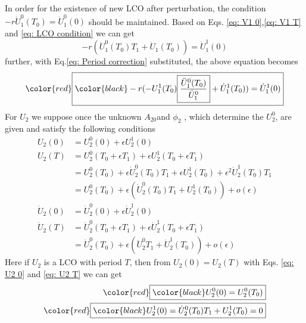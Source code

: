 \documentclass{article}
\begin{document}
In order for the existence of new LCO after perturbation, the condition $-r\dot{U}_1^0(T_0)=\dot{U}_1^0(0)$ should be maintained. Based on Eqs. \ref{eq: V1 0},\ref{eq: V1 T} and \ref{eq: LCO condition}
we can get \[-r(\ddot{U}_1^0(T_0)T_1+\dot{U}_1(T_0))=\dot{U}_1^1(0)\]
further, with Eq.\ref{eq: Period correction} substituted, the above equation becomes 
\begin{equation}
   {\color{red} \boxed{ \color{black} -r(-U_1^1(T_0) \boxed{\frac{\ddot{U}_1^0(T_0)} {\dot{U}_1^0}} +\dot{U}_1^1(T_0))=\dot{U}_1^1(0)}}
\end{equation}
For $U_2$ we suppose once the unknown $\boxed{A_{20}} $and $\boxed{\phi_2}$ , which determine the $U_2^0$, are given and satisfy the following conditions
\begin{align}
    \label{eq: U2 0}
    U_2(0)&=U_2^0(0)+\epsilon U_2^1(0)\\ \nonumber 
    U_2(T)&=U_2^0(T_0+\epsilon T_1)+\epsilon U_2^1(T_0+\epsilon T_1)\\ \nonumber
    &=U_2^0(T_0)+\epsilon \dot{U}_2^0(T_0)T_1 +\epsilon U_2^1(T_0)+\epsilon^2 \dot{U}_2^1(T_0)T_1\\  \label{eq: U2 T}
    &= U_2^0(T_0)+\epsilon(\dot{U}_2^0(T_0)T_1 + U_2^1(T_0))+o(\epsilon)\\ \label{eq: V2 0}
    \dot{U}_2(0)&=\dot{U}_2^0(0)+ \epsilon \dot{U}_2^1(0)\\  \nonumber \dot{U}_2(T)&=\dot{U}_2^0(T_0+\epsilon T_1)+\epsilon \dot{U}_2^1(T_0+\epsilon T_1)\\ \label{eq: V2 T}
    &=\dot{U}_2^0(T_0)+\epsilon(\ddot{U}_2^0 T_1+\dot{U}_2^1(T_0))+o(\epsilon)
\end{align}
Here if $U_2$ is a LCO with period $T$, then from $U_2(0)=U_2(T)$ with Eqs. \ref{eq: U2 0} and \ref{eq: U2 T} we can get 
\begin{align}
     {\color{red} \boxed{ \color{black} U_2^0(0)=U_2^0(T_0)}}\\
    {\color{red} \boxed{ \color{black}U_2^1(0)=\dot{U}_2^0(T_0)T_1+U_2^1(T_0)=0 }}
\end{align}
\end{document}

